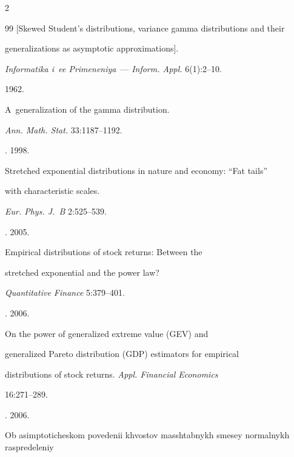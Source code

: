 \begin{multicols}{2}
{{\begin{thebibliography}{99}
[Skewed Student's distributions, variance gamma distributions and their 


generalizations as asymptotic approximations].


\textit{Informatika i~ee Primeneniya}~--- \textit{Inform. Appl.} 6(1):2--10.





  1962.


A~generalization of the gamma distribution.


\textit{Ann. Math. Stat.} 33:1187--1192.







. 1998.


Stretched exponential distributions in nature and economy: ``Fat tails'' 


with characteristic scales.


\textit{Eur. Phys. J.~B} 2:525--539.







. 2005.


Empirical distributions of stock returns: Between the


stretched exponential and the power law? 


\textit{Quantitative Finance} 5:379--401.







. 2006.


On the power of generalized extreme value (GEV) and


generalized Pareto distribution (GDP) estimators for empirical


distributions of stock returns. \textit{Appl. Financial Economics}


16:271--289.







. 2006.


Ob asimptoticheskom povedenii khvostov masshtabnykh smesey normalnykh raspredeleniy



\end{thebibliography}}}
\end{multicols}
